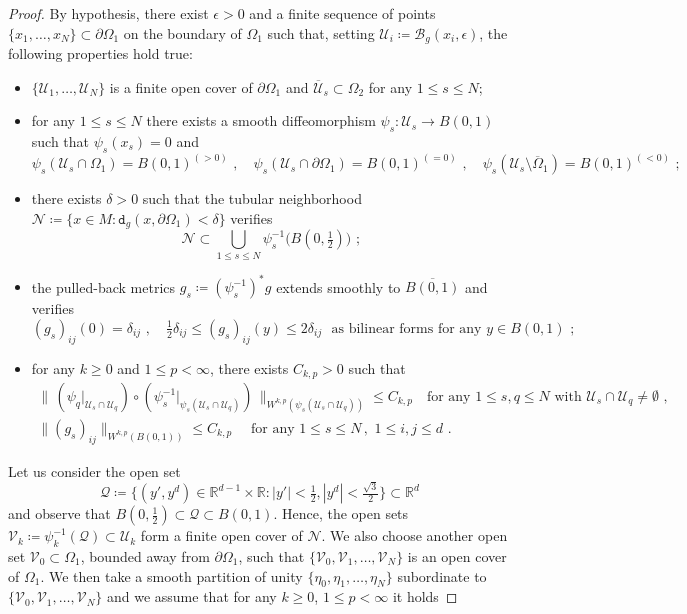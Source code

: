 \documentclass[10pt, a4paper, reqno, oneside]{amsart}
\theoremstyle{plain}
\theoremstyle{definition}
\theoremstyle{plain}
\theoremstyle{definition}
\theoremstyle{plain}
\renewcommand{\=}{:=}
\begin{document}
\begin{proof}
By hypothesis, there exist $\epsilon>0$ and a finite sequence of points $\{x_1,{\dots},x_N\} \subset \partial \Omega_1$ on the boundary of $\Omega_1$ such that, setting $\mathcal{U}_i \coloneqq \mathscr{B}_g(x_i,\epsilon)$, the following properties hold true: \begin{itemize}
\item[$i)$] $\big\{\mathcal{U}_1,{\dots},\mathcal{U}_N\big\}$ is a finite open cover of $\partial \Omega_1$ and $\overline{\mathcal{U}}_s \subset \Omega_2$ for any $1 \leq s \leq N$;
\item[$ii)$] for any $1 \leq s \leq N$ there exists a smooth diffeomorphism $\psi_s : \mathcal{U}_s \to B(0,1)$ such that $\psi_s(x_s)=0$ and
$$
\psi_s(\mathcal{U}_s \cap \Omega_1) = B(0,1)^{(>0)} \,\, , \quad
\psi_s(\mathcal{U}_s \cap \partial \Omega_1) = B(0,1)^{(=0)} \,\, , \quad
\psi_s(\mathcal{U}_s \setminus \overline{\Omega}_1) = B(0,1)^{(<0)} \,\, ;
$$
\item[$iii)$] there exists $\delta>0$ such that the tubular neighborhood $\mathcal{N} \coloneqq \{x \in M : \mathtt{d}_g(x,\partial \Omega_1) < \delta\}$ verifies
$$
\mathcal{N} \subset \bigcup_{1 \leq s \leq N} \psi_s^{-1} \big(B(0,\tfrac12)\big) \,\, ;
$$
\item[$iv)$] the pulled-back metrics $g_s \coloneqq (\psi_s^{-1})^*g$ extends smoothly to $\overline{B(0,1)}$ and verifies
$$
(g_s)_{ij}(0) = \delta_{ij} \,\, , \quad \tfrac12\delta_{ij}\leq (g_s)_{ij}(y) \leq 2\delta_{ij} \,\, \text{ as bilinear forms for any $y \in B(0,1)$} \,\, ;
$$
\item[$v)$] for any $k \geq 0$ and $1 \leq p < \infty$, there exists $C_{k,p}>0$ such that
$$\begin{gathered}
\big\|\, (\psi_q|_{\mathcal{U}_s \cap \mathcal{U}_q}) \circ (\psi_s^{-1}|_{\psi_s(\mathcal{U}_s \cap \mathcal{U}_q)}) \,\big\|_{W^{k,p}(\psi_s(\mathcal{U}_s \cap \mathcal{U}_q))} \leq C_{k,p} \quad \text{for any $1 \leq s , q \leq N$ with $\mathcal{U}_s \cap \mathcal{U}_q \neq \emptyset$} \,\, , \\
\|(g_s)_{ij}\|_{W^{k,p}(B(0,1))} \leq C_{k,p} \quad \text{ for any } 1 \leq s \leq N \, , \,\, 1 \leq i,j \leq d \,\, . 
\end{gathered}$$
\end{itemize}
Let us consider the open set
$$
\mathcal{Q} \coloneqq \Big\{(y',y^d) \in \mathbb{R}^{d-1} \times \mathbb{R} : |y'| < \tfrac12 , |y^d| < \tfrac{\sqrt3}2 \Big\} \subset \mathbb{R}^d
$$
and observe that $B(0,\tfrac12) \subset \mathcal{Q} \subset B(0,1)$. Hence, the open sets $\mathcal{V}_k \coloneqq \psi_k^{-1}(\mathcal{Q}) \subset \mathcal{U}_k$ form a finite open cover of $\mathcal{N}$. We also choose another open set $\mathcal{V}_0 \subset \Omega_1$, bounded away from $\partial \Omega_1$, such that $\{\mathcal{V}_0,\mathcal{V}_1,{\dots},\mathcal{V}_N\}$ is an open cover of $\Omega_1$. We then take a smooth partition of unity $\{\eta_0,\eta_1,{\dots},\eta_N\}$ subordinate to $\{\mathcal{V}_0,\mathcal{V}_1,{\dots},\mathcal{V}_N\}$ and we assume that for any $k \geq 0$, $1 \leq p < \infty$ it holds

\end{proof}
\end{document}
